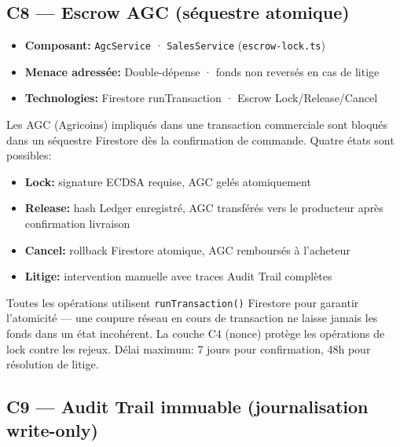 \documentclass[12pt,a4paper]{report}
\begin{document}
\vspace{0.1cm}

\subsection{C8 — Escrow AGC (séquestre atomique)}

\begin{tcolorbox}[definbox,title={Couche C8 --- Escrow AGC}]
  \begin{itemize}[itemsep=5pt]
    \item \textbf{Composant:} \texttt{AgcService} · \texttt{SalesService} (\texttt{escrow-lock.ts})
    \item \textbf{Menace adressée:} Double-dépense · fonds non reversés en cas de litige
    \item \textbf{Technologies:} Firestore runTransaction · Escrow Lock/Release/Cancel
  \end{itemize}
  \vspace{0.3cm}
  Les AGC (Agricoins) impliqués dans une transaction commerciale sont bloqués dans un
  séquestre Firestore dès la confirmation de commande. Quatre états sont possibles:
  \begin{itemize}
    \item \textbf{Lock:} signature ECDSA requise, AGC gelés atomiquement
    \item \textbf{Release:} hash Ledger enregistré, AGC transférés vers le producteur après confirmation livraison
    \item \textbf{Cancel:} rollback Firestore atomique, AGC remboursés à l'acheteur
    \item \textbf{Litige:} intervention manuelle avec traces Audit Trail complètes
  \end{itemize}
  Toutes les opérations utilisent \texttt{runTransaction()} Firestore pour garantir
  l'atomicité --- une coupure réseau en cours de transaction ne laisse jamais les fonds
  dans un état incohérent. La couche C4 (nonce) protège les opérations de lock contre les
  rejeux. Délai maximum: 7 jours pour confirmation, 48h pour résolution de litige.
\end{tcolorbox}

\vspace{0.3cm}

\subsection{C9 — Audit Trail immuable (journalisation write-only)}
\end{document}
